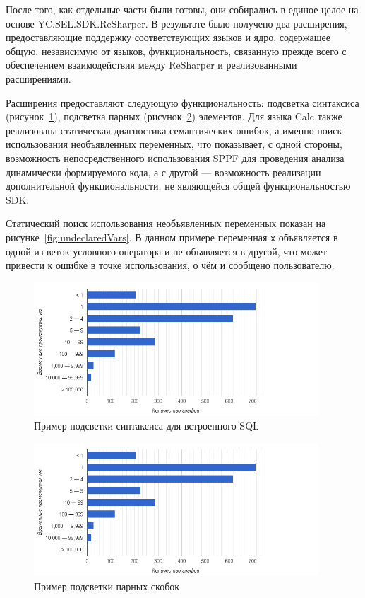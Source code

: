 После того, как отдельные части были готовы, они собирались в единое целое на основе YC.SEL.SDK.ReSharper. В результате было получено два расширения, предоставляющие поддержку соответствующих языков и ядро, содержащее общую, независимую от языков, функциональность, связанную прежде всего с обеспечением взаимодействия между ReSharper и реализованными расширениями.

Расширения предоставляют следующую функциональность: подсветка синтаксиса (рисунок~\ref{fig:sHiglighting}), подсветка парных (рисунок~\ref{fig:braces}) элементов. Для языка Calc также реализована статическая диагностика семантических ошибок, а именно поиск использования необъявленных переменных, что показывает, с одной стороны, возможность непосредственного использования SPPF для проведения анализа динамически формируемого кода, а с другой --- возможность реализации дополнительной функциональности, не являющейся общей функциональностью SDK.

Статический поиск использования необъявленных переменных показан на 
рисунке~\ref{fig:undeclaredVars}. В данном примере переменная \verb|x| объявляется в одной из веток условного оператора и не объявляется в другой, что может привести к ошибке в точке использования, о чём и сообщено пользователю.

\begin{figure}[H]
  \centering
 \includegraphics[width=0.95\textwidth]{pics/distr.png}
 \caption{Пример подсветки синтаксиса для встроенного SQL}
 \label{fig:sHiglighting}
\end{figure}

\begin{figure}[H]
  \centering
 \includegraphics[width=0.95\textwidth]{pics/distr.png}
 \caption{Пример подсветки парных скобок}
 \label{fig:braces}
\end{figure}

